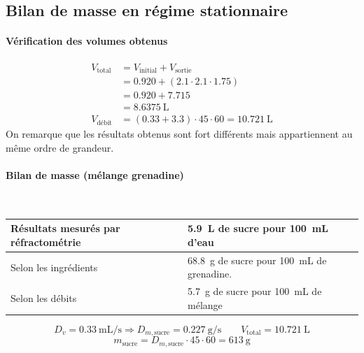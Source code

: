 \documentclass[a4paper,11pt, french]{article}
\begin{document}
\subsection{Bilan de masse en régime stationnaire}
	\paragraph*{Vérification des volumes obtenus}
		\begin{align*} 
			V_\text{total} &= V_\text{initial} + V_\text{sortie} \\
						   &= 0.920 + ( 2.1 \cdot 2.1 \cdot 1.75 ) \\
						   &= 0.920 + 7.715 \\
						   &= \SI{8.6375}{\liter} \\
			V_\text{débit} &= (0.33 + 3.3) \cdot 45 \cdot 60 = \SI{10.721}{\liter}
		\end{align*}
		On remarque que les résultats obtenus sont fort différents mais appartiennent au même ordre de grandeur.
	\paragraph*{Bilan de masse (mélange grenadine)}\mbox{} \\
		\begin{table}[h]
			\centering
			\begin{tabular}{|l|l|}\hline
				Résultats mesurés par réfractométrie & \SI{5.9}{\liter} de sucre pour \SI{100}{\milli\liter} d'eau\\\hline
				Selon les ingrédients & \SI{68.8}{\gram} de sucre pour \SI{100}{\milli\liter} de grenadine.\\\hline
				Selon les débits & \SI{5.7}{\gram} de sucre pour \SI{100}{\milli\liter} de mélange\\\hline
			\end{tabular}
		\end{table}
		$$D_v = \SI{0.33}{\milli\liter\per\second} \Rightarrow D_{m,\text{sucre}} = \SI{0.227}{\gram\per\second} \qquad V_\text{total} = \SI{10.721}{\liter}$$
		$$m_\text{sucre} = D_{m,\text{sucre}} \cdot 45 \cdot 60 = \SI{613}{\gram}$$
\end{document}
